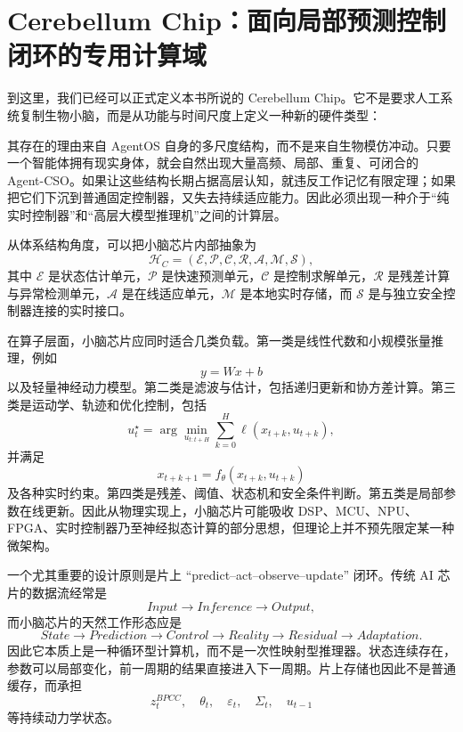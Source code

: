 \section{Cerebellum Chip：面向局部预测控制闭环的专用计算域}

到这里，我们已经可以正式定义本书所说的 Cerebellum Chip。它不是要求人工系统复制生物小脑，而是从功能与时间尺度上定义一种新的硬件类型：
\begin{statementbox}
\centering
{}
\end{statementbox}
其存在的理由来自 AgentOS 自身的多尺度结构，而不是来自生物模仿冲动。只要一个智能体拥有现实身体，就会自然出现大量高频、局部、重复、可闭合的 Agent-CSO。如果让这些结构长期占据高层认知，就违反工作记忆有限定理；如果把它们下沉到普通固定控制器，又失去持续适应能力。因此必须出现一种介于“纯实时控制器”和“高层大模型推理机”之间的计算层。

从体系结构角度，可以把小脑芯片内部抽象为
\[
\mathcal H_C
=
(
\mathcal E,
\mathcal P,
\mathcal C,
\mathcal R,
\mathcal A,
\mathcal M,
\mathcal S
),
\]
其中 $\mathcal E$ 是状态估计单元，$\mathcal P$ 是快速预测单元，$\mathcal C$ 是控制求解单元，$\mathcal R$ 是残差计算与异常检测单元，$\mathcal A$ 是在线适应单元，$\mathcal M$ 是本地实时存储，而 $\mathcal S$ 是与独立安全控制器连接的实时接口。

在算子层面，小脑芯片应同时适合几类负载。第一类是线性代数和小规模张量推理，例如
\[
y=Wx+b
\]
以及轻量神经动力模型。第二类是滤波与估计，包括递归更新和协方差计算。第三类是运动学、轨迹和优化控制，包括
\[
u_t^\star
=
\arg\min_{u_{t:t+H}}
\sum_{k=0}^{H}
\ell(x_{t+k},u_{t+k}),
\]
并满足
\[
x_{t+k+1}
=
f_\theta(x_{t+k},u_{t+k})
\]
及各种实时约束。第四类是残差、阈值、状态机和安全条件判断。第五类是局部参数在线更新。因此从物理实现上，小脑芯片可能吸收 DSP、MCU、NPU、FPGA、实时控制器乃至神经拟态计算的部分思想，但理论上并不预先限定某一种微架构。

一个尤其重要的设计原则是片上 ``predict--act--observe--update'' 闭环。传统 AI 芯片的数据流经常是
\[
Input
\rightarrow
Inference
\rightarrow
Output,
\]
而小脑芯片的天然工作形态应是
\[
State
\rightarrow
Prediction
\rightarrow
Control
\rightarrow
Reality
\rightarrow
Residual
\rightarrow
Adaptation.
\]
因此它本质上是一种循环型计算机，而不是一次性映射型推理器。状态连续存在，参数可以局部变化，前一周期的结果直接进入下一周期。片上存储也因此不是普通缓存，而承担
\[
z_t^{BPCC},
\quad
\theta_t,
\quad
\varepsilon_t,
\quad
\Sigma_t,
\quad
u_{t-1}
\]
等持续动力学状态。

